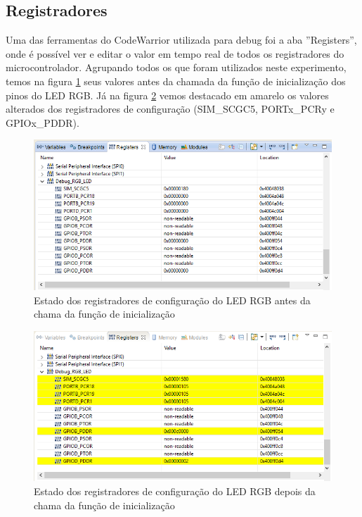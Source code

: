 \documentclass{article}
\begin{document}
\subsection{Registradores}
Uma das ferramentas do CodeWarrior utilizada para debug foi a aba ''Registers'', onde é possível ver e editar o valor em tempo real de todos os registradores do microcontrolador. Agrupando todos os que foram utilizados neste experimento, temos na figura \ref{reg_antes} seus valores antes da chamada da função de inicialização dos pinos do LED RGB. Já na figura \ref{reg_depois} vemos destacado em amarelo os valores alterados dos registradores de configuração (SIM\_SCGC5, PORTx\_PCRy e GPIOx\_PDDR).

\begin{figure}[ht!]
  \centering
  \includegraphics[width=160mm]{before_rgb_init.png}
  \caption{Estado dos registradores de configuração do LED RGB antes da chama da função de inicialização \label{reg_antes}}
\end{figure}

\begin{figure}[ht!]
  \centering
  \includegraphics[width=160mm]{after_rgb_init.png}
  \caption{Estado dos registradores de configuração do LED RGB depois da chama da função de inicialização \label{reg_depois}}
\end{figure}
\end{document}
